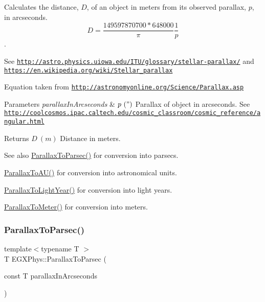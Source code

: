 Calculates the distance, $D$, of an object in meters from its observed parallax, $p$, in arcseconds. \[ D=\dfrac{149597870700 * 648000}{\pi}\dfrac{1}{p}\]. 

See \href{http://astro.physics.uiowa.edu/ITU/glossary/stellar-parallax/}{\tt http\+://astro.\+physics.\+uiowa.\+edu/\+I\+T\+U/glossary/stellar-\/parallax/} and \href{https://en.wikipedia.org/wiki/Stellar_parallax}{\tt https\+://en.\+wikipedia.\+org/wiki/\+Stellar\+\_\+parallax}

Equation taken from \href{http://astronomyonline.org/Science/Parallax.asp}{\tt http\+://astronomyonline.\+org/\+Science/\+Parallax.\+asp}


\begin{DoxyParams}{Parameters}
{\em parallax\+In\+Arcseconds} & $ p\ (")$ Parallax of object in arcseconds. See \href{http://coolcosmos.ipac.caltech.edu/cosmic_classroom/cosmic_reference/angular.html}{\tt http\+://coolcosmos.\+ipac.\+caltech.\+edu/cosmic\+\_\+classroom/cosmic\+\_\+reference/angular.\+html} \\
\hline
\end{DoxyParams}
\begin{DoxyReturn}{Returns}
$ D\ (m)$ Distance in meters. 
\end{DoxyReturn}
\begin{DoxySeeAlso}{See also}
\mbox{\hyperlink{group___e_g_x_phys-_astrophysic-_parallax_gab42dbec142e1a47925fc45e899845861}{Parallax\+To\+Parsec()}} for conversion into parsecs. 

\mbox{\hyperlink{group___e_g_x_phys-_astrophysic-_parallax_ga2085f91170baba79a7fcc8a0ba77d1eb}{Parallax\+To\+A\+U()}} for conversion into astronomical units. 

\mbox{\hyperlink{group___e_g_x_phys-_astrophysic-_parallax_gacaec31498f264e2a1dc285062a394de2}{Parallax\+To\+Light\+Year()}} for conversion into light years. 

\mbox{\hyperlink{group___e_g_x_phys-_astrophysic-_parallax_ga94912bf8b98a04cccab8ef19eaa89b6a}{Parallax\+To\+Meter()}} for conversion into meters. 
\end{DoxySeeAlso}
\mbox{\label{group___e_g_x_phys-_astrophysic-_parallax_gab42dbec142e1a47925fc45e899845861}} 
\subsubsection{\texorpdfstring{Parallax\+To\+Parsec()}{ParallaxToParsec()}}
{\footnotesize\ttfamily template$<$typename T $>$ \\
T E\+G\+X\+Phys\+::\+Parallax\+To\+Parsec (\begin{DoxyParamCaption}\item[{const T}]{parallax\+In\+Arcseconds }\end{DoxyParamCaption})}



